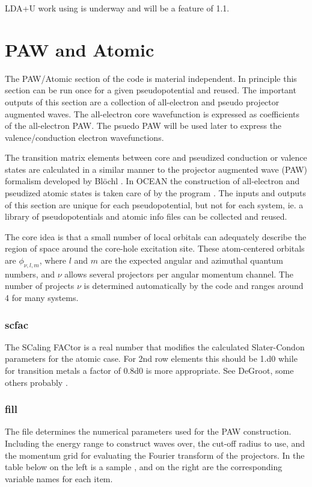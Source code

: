 \documentclass[11pt]{report}
\begin{document}
LDA+U work using  is underway and will be a feature of  1.1.


\chapter{PAW and Atomic}
\label{paw}

The PAW/Atomic section of the code is material independent. In principle this section can be run once
for a given pseudopotential and reused. The important outputs of this section are a collection of 
all-electron and pseudo projector augmented waves. The all-electron core wavefunction is expressed
as coefficients of the all-electron PAW. The psuedo PAW will be used later to express the valence/conduction
electron wavefunctions.

The transition matrix elements between core and pseudized conduction or valence states are calculated 
in a similar manner to the projector augmented wave (PAW) formalism developed by Bl\"{o}chl \cite{Bloechl}. In OCEAN
the construction of all-electron and pseudized atomic states is taken care of by the program . 
The inputs and outputs of this section are unique for each pseudopotential, but not for each system, ie. 
a library of pseudopotentials and atomic info files can be collected and reused.

The core idea is that a small number of local orbitals can adequately describe the region of space around the 
core-hole excitation site. These atom-centered orbitals are $\phi_{\nu,l,m}$, where $l$ and $m$ are the 
expected angular and azimuthal quantum numbers, and $\nu$ allows several projectors per angular momentum channel. 
The number of projects $\nu$ is determined automatically by the code and ranges around 4 for many systems. 

\subsection{scfac}
The SCaling FACtor is a real number that modifies the calculated Slater-Condon parameters for the atomic case. For 2nd row elements this should be 1.d0 while for transition metals a factor of 0.8d0 is more appropriate. See DeGroot, some others probably \cite{SCFAC}.

\subsection{fill}
\label{fill}
The  file determines the numerical parameters used for the PAW construction. Including the energy range to construct waves over,
the cut-off radius to use, and the momentum grid for evaluating the Fourier transform of the projectors. 
In the table below on the left is a sample , and on the right are the corresponding variable names for each item.
\end{document}
